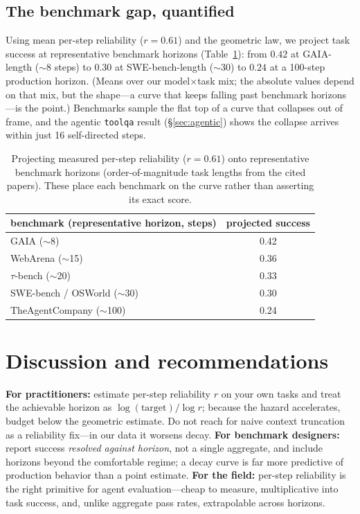 \documentclass[11pt]{article}
\newcommand{\rstep}{r}
\begin{document}
\subsection{The benchmark gap, quantified}\label{sec:gap}
Using mean per-step reliability ($\rstep{=}0.61$) and the geometric law, we project task
success at representative benchmark horizons (Table~\ref{tab:gap}): from $0.42$ at
GAIA-length ($\sim$8 steps) to $0.30$ at SWE-bench-length ($\sim$30) to $0.24$ at a
100-step production horizon. (Means over our model$\times$task mix; the absolute values
depend on that mix, but the shape---a curve that keeps falling past benchmark
horizons---is the point.) Benchmarks sample the flat top of a curve that collapses out
of frame, and the agentic \texttt{toolqa} result (\S\ref{sec:agentic}) shows the
collapse arrives within just 16 self-directed steps.

\begin{table}[t]
\centering\small
\begin{tabular}{lc}
\toprule
benchmark (representative horizon, steps) & projected success \\
\midrule
GAIA ($\sim$8)              & 0.42 \\
WebArena ($\sim$15)        & 0.36 \\
$\tau$-bench ($\sim$20)    & 0.33 \\
SWE-bench / OSWorld ($\sim$30) & 0.30 \\
TheAgentCompany ($\sim$100) & 0.24 \\
\bottomrule
\end{tabular}
\caption{Projecting measured per-step reliability ($\rstep{=}0.61$) onto representative
benchmark horizons (order-of-magnitude task lengths from the cited papers). These place
each benchmark on the curve rather than asserting its exact score.}
\label{tab:gap}
\end{table}

\section{Discussion and recommendations}
\textbf{For practitioners:} estimate per-step reliability $\rstep$ on your own tasks and
treat the achievable horizon as $\log(\text{target})/\log \rstep$; because the hazard
accelerates, budget below the geometric estimate. Do not reach for naive context
truncation as a reliability fix---in our data it worsens decay. \textbf{For benchmark
designers:} report success \emph{resolved against horizon}, not a single aggregate, and
include horizons beyond the comfortable regime; a decay curve is far more predictive of
production behavior than a point estimate. \textbf{For the field:} per-step reliability
is the right primitive for agent evaluation---cheap to measure, multiplicative into task
success, and, unlike aggregate pass rates, extrapolable across horizons.
\end{document}
